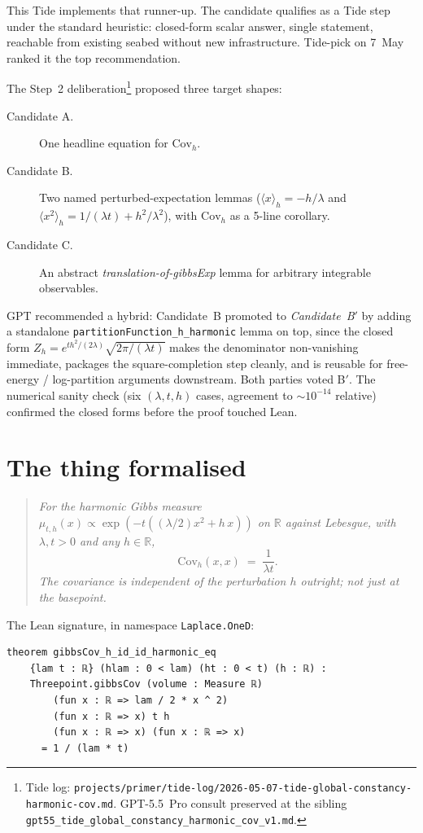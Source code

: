 \documentclass[11pt]{article}
\begin{document}
This Tide implements that runner-up. The candidate qualifies as a
Tide step under the standard heuristic: closed-form scalar answer,
single statement, reachable from existing seabed without new
infrastructure. Tide-pick on 7~May ranked it the top recommendation.

The Step~2 deliberation\footnote{Tide log:
\texttt{projects/primer/tide-log/2026-05-07-tide-global-constancy-harmonic-cov.md}.
GPT-5.5~Pro consult preserved at the sibling
\texttt{gpt55\_tide\_global\_constancy\_harmonic\_cov\_v1.md}.}
proposed three target shapes:

\begin{description}
\item[Candidate A.] One headline equation for $\mathrm{Cov}_h$.
\item[Candidate B.] Two named perturbed-expectation lemmas
  ($\langle x \rangle_h{=}-h/\lambda$ and $\langle x^2\rangle_h{=}1/(\lambda t)+h^2/\lambda^2$),
  with $\mathrm{Cov}_h$ as a 5-line corollary.
\item[Candidate C.] An abstract \emph{translation-of-gibbsExp} lemma
  for arbitrary integrable observables.
\end{description}

GPT recommended a hybrid: Candidate~B promoted to \emph{Candidate~B$'$}
by adding a standalone \texttt{partitionFunction\_h\_harmonic} lemma
on top, since the closed form $Z_h = e^{th^2/(2\lambda)}\sqrt{2\pi/(\lambda t)}$
makes the denominator non-vanishing immediate, packages the
square-completion step cleanly, and is reusable for free-energy /
log-partition arguments downstream. Both parties voted B$'$. The
numerical sanity check (six $(\lambda,t,h)$ cases, agreement to
$\sim 10^{-14}$ relative) confirmed the closed forms before the proof
touched Lean.

\section{The thing formalised}

\begin{quote}\itshape
For the harmonic Gibbs measure
$\mu_{t,h}(x) \propto \exp(-t((\lambda/2)x^2 + h\,x))$ on $\mathbb{R}$
against Lebesgue, with $\lambda, t > 0$ and any $h \in \mathbb{R}$,
\[
  \mathrm{Cov}_h(x, x) \;=\; \frac{1}{\lambda t}.
\]
The covariance is independent of the perturbation $h$ outright; not
just at the basepoint.
\end{quote}

\noindent The Lean signature, in namespace \texttt{Laplace.OneD}:
\begin{verbatim}
theorem gibbsCov_h_id_id_harmonic_eq
    {lam t : ℝ} (hlam : 0 < lam) (ht : 0 < t) (h : ℝ) :
    Threepoint.gibbsCov (volume : Measure ℝ)
        (fun x : ℝ => lam / 2 * x ^ 2)
        (fun x : ℝ => x) t h
        (fun x : ℝ => x) (fun x : ℝ => x)
      = 1 / (lam * t)
\end{verbatim}
\end{document}
